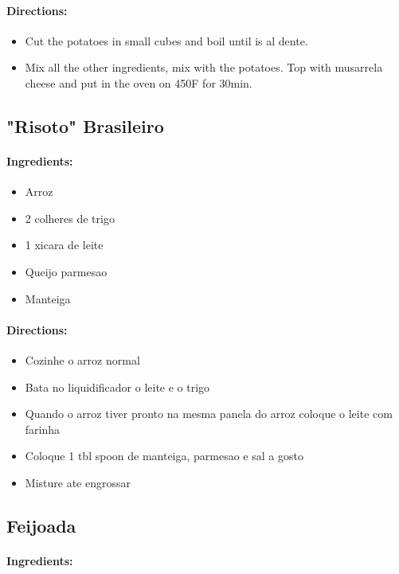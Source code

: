 \documentclass{article}
\begin{document}
\paragraph{Directions:}
\begin{itemize}
	\item Cut the potatoes in small cubes and boil until is al dente.
	\item Mix all the other ingredients, mix with the potatoes. Top with musarrela cheese and put in the oven on 450F for 30min.
\end{itemize}

\subsection{"Risoto" Brasileiro}

\paragraph{Ingredients:}

\begin{itemize}
	\item Arroz
	\item 2 colheres de trigo
	\item 1 xicara de leite
	\item Queijo parmesao
	\item Manteiga
\end{itemize}

\paragraph{Directions:}
\begin{itemize}
	\item Cozinhe o arroz normal
	\item Bata no liquidificador o leite e o trigo
	\item Quando o arroz tiver pronto na mesma panela do arroz coloque o leite com farinha
	\item Coloque 1 tbl spoon de manteiga, parmesao e sal a gosto
	\item Misture ate engrossar
\end{itemize} 

\subsection{Feijoada}

\paragraph{Ingredients:}
\end{document}

